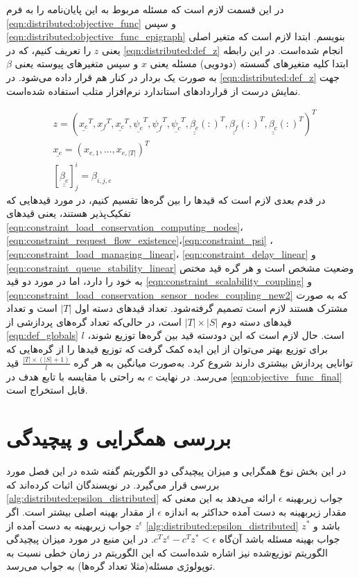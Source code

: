 	در این قسمت لازم است که مسئله مربوط به این پایان‌نامه را به فرم \cref{eqn:distributed:objective_func} و سپس \cref{eqn:distributed:objective_func_epigraph} بنویسم. ابتدا لازم است که متغیر اصلی یعنی $z$ را تعریف کنیم، که در \cref{eqn:distributed:def_z} انجام شده‌است. در این رابطه ابتدا کلیه متغیرهای گسسته (دودویی) مسئله یعنی $x$  و سپس متغیرهای پیوسته یعنی $\beta$ به صورت یک بردار در کنار هم قرار داده می‌شود. در \cref{eqn:distributed:def_z} جهت نمایش درست از قراردادهای استاندارد نرم‌افزار متلب استفاده شده‌است. 
	
\begin{subequations}\label{eqn:distributed:def_z}
	\begin{align}
		&z = (\underline{x_e}^T, \underline{x_f}^T, \underline{x_c}^T, 
		\underline{\psi_e}^T, \underline{\psi_f}^T, \underline{\psi_c}^T,
		\underline{\underline{\beta_{e}}}(:)^T, \underline{\underline{\beta_{f}}}(:)^T, \underline{\underline{\beta_{c}}}(:)^T)^T \\
		&\underline{x_e} = (x_{e,1}, \dots, x_{e,|T|})^T \\
		&[\underline{\underline{\beta_{e}}}]^i_j = \beta_{i,j,e}
	\end{align}
\end{subequations}
در قدم بعدی لازم است که قیدها را بین گره‌ها تقسیم کنیم، در مورد قیدهایی که تفکیک‌پذیر هستند، یعنی قیدهای \cref{eqn:constraint_load_conservation_computing_nodes}، \cref{eqn:constraint_request_flow_existence}،\cref{eqn:constraint_psi} ، \cref{eqn:constraint_load_managing_linear}، \cref{eqn:constraint_delay_linear} و \cref{eqn:constraint_queue_stability_linear} وضعیت مشخص است و هر گره قید مختص به خود را دارد، اما در مورد دو قید \cref{eqn:constraint_scalability_coupling} و \cref{eqn:constraint_load_conservation_sensor_nodes_coupling_new2} که به صورت مشترک هستند لازم است تصمیم گرفته‌شود. تعداد قیدهای دسته اول $|T|$ است و تعداد قیدهای دسته دوم $|T| \times |S|$ است، در حالی‌که تعداد گره‌های پردازشی از \cref{eqn:def_globals} $l$ است. حال لازم است که این دودسته قید بین گره‌ها توزیع شوند، برای توزیع بهتر می‌توان از این ایده کمک گرفت که توزیع قیدها را از گره‌هایی که توانایی پردازش بیشتری دارند شروع کرد. به‌صورت میانگین به هر گره $\frac{|T|\times(|S|+1)}{l}$ قید می‌رسد. در نهایت $c$ به راحتی با مقایسه با تابع هدف در \cref{eqn:objective_func_final} قابل استخراج است. 

\section{بررسی همگرایی و پیچیدگی}
	در این بخش نوع همگرایی و میزان پیچیدگی دو الگوریتم گفته شده در این فصل مورد بررسی قرار می‌گیرد. 
	در \cite{testa2019distributed} نویسندگان اثبات کرده‌اند که \cref{alg:distributed:epsilon_distributed} جواب زیربهینه $\epsilon$ ارائه می‌دهد به این معنی که مقدار زیربهینه به دست آمده حداکثر به اندازه $\epsilon$ از مقدار بهینه اصلی بیشتر است. اگر $z^\epsilon$ جواب زیربهینه به دست آمده از \cref{alg:distributed:epsilon_distributed} باشد و $z^*$ جواب بهینه مسئله باشد آن‌گاه $c^Tz^\epsilon - c^Tz^* < \epsilon$.
	در این منبع در مورد میزان پیچیدگی الگوریتم توزیع‌شده نیز اشاره شده‌است که این الگوریتم در زمان خطی نسبت به توپولوژی مسئله(مثلا تعداد گره‌ها) به جواب می‌رسد. 
	

